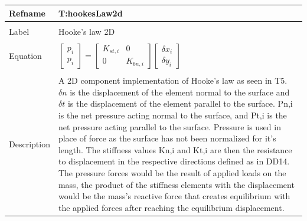 \documentclass[12pt]{article}
\begin{document}
\noindent \begin{minipage}{\textwidth}
\begin{tabular}{p{} p{}}
\toprule \textbf{Refname} & \textbf{T:hookesLaw2d}
\label{T:hookesLaw2d}
\\ \midrule \\
Label & Hooke's law 2D
\\ \midrule \\
Equation & $\begin{bmatrix}
p_{i}\\
p_{i}
\end{bmatrix}=\begin{bmatrix}
K_{st,i} & 0\\
0 & K_{bn,i}
\end{bmatrix}\begin{bmatrix}
{\delta{}x}_{i}\\
{\delta{}y}_{i}
\end{bmatrix}$
\\ \midrule \\
Description & A 2D component implementation of Hooke's law as seen in T5. $\delta{}n$ is the displacement of the element normal to the surface and $\delta{}t$ is the displacement of the element parallel to the surface. Pn,i is the net pressure acting normal to the surface, and Pt,i is the net pressure acting parallel to the surface. Pressure is used in place of force as the surface has not been normalized for it's length. The stiffness values Kn,i and Kt,i are then the resistance to displacement in the respective directions defined as in DD14. The pressure forces would be the result of applied loads on the mass, the product of the stiffness elements with the displacement would be the mass's reactive force that creates equilibrium with the applied forces after reaching the equilibrium displacement.
\\ \bottomrule \end{tabular}
\end{minipage}\\
~\newline
\end{document}
